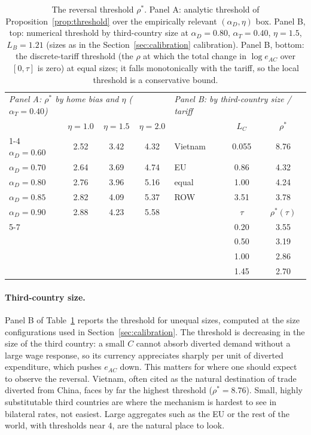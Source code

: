\documentclass[11pt]{article}
\theoremstyle{plain}
\theoremstyle{remark}
\numberwithin{lemma}{section}
\numberwithin{proposition}{section}
\numberwithin{corollary}{section}
\newenvironment{revblock}{\par\begingroup\color{RevBlue}}{\endgroup\par}
\begin{document}
\begin{revblock}
\begin{table}[htbp]
\centering
\begin{tabular}{lccc@{\hspace{1.2cm}}lcc}
\hline\hline
\multicolumn{4}{l}{\textit{Panel A: $\rho^*$ by home bias and $\eta$ ($\alpha_T = 0.40$)}} & \multicolumn{3}{l}{\textit{Panel B: by third-country size / tariff}} \\[2pt]
 & $\eta = 1.0$ & $\eta = 1.5$ & $\eta = 2.0$ & & $L_C$ & $\rho^*$ \\
\cline{1-4}\cline{5-7}
$\alpha_D = 0.60$ & 2.52 & 3.42 & 4.32 & Vietnam & 0.055 & 8.76 \\
$\alpha_D = 0.70$ & 2.64 & 3.69 & 4.74 & EU & 0.86 & 4.32 \\
$\alpha_D = 0.80$ & 2.76 & 3.96 & 5.16 & equal & 1.00 & 4.24 \\
$\alpha_D = 0.85$ & 2.82 & 4.09 & 5.37 & ROW & 3.51 & 3.78 \\
$\alpha_D = 0.90$ & 2.88 & 4.23 & 5.58 & & $\tau$ & $\rho^*(\tau)$ \\
\cline{5-7}
 & & & & & 0.20 & 3.55 \\
 & & & & & 0.50 & 3.19 \\
 & & & & & 1.00 & 2.86 \\
 & & & & & 1.45 & 2.70 \\
\hline\hline
\end{tabular}
\caption{The reversal threshold $\rho^*$. Panel A: analytic threshold of Proposition~\ref{prop:threshold} over the empirically relevant $(\alpha_D, \eta)$ box. Panel B, top: numerical threshold by third-country size at $\alpha_D = 0.80$, $\alpha_T = 0.40$, $\eta = 1.5$, $L_B = 1.21$ (sizes as in the Section~\ref{sec:calibration} calibration). Panel B, bottom: the discrete-tariff threshold (the $\rho$ at which the total change in $\log e_{AC}$ over $[0, \tau]$ is zero) at equal sizes; it falls monotonically with the tariff, so the local threshold is a conservative bound.}
\label{tab:rhostar_grid}
\end{table}

\paragraph{Third-country size.} Panel B of Table~\ref{tab:rhostar_grid} reports the threshold for unequal sizes, computed at the size configurations used in Section~\ref{sec:calibration}. The threshold is decreasing in the size of the third country: a small $C$ cannot absorb diverted demand without a large wage response, so its currency appreciates sharply per unit of diverted expenditure, which pushes $e_{AC}$ down. This matters for where one should expect to observe the reversal. Vietnam, often cited as the natural destination of trade diverted from China, faces by far the highest threshold ($\rho^* = 8.76$). Small, highly substitutable third countries are where the mechanism is hardest to see in bilateral rates, not easiest. Large aggregates such as the EU or the rest of the world, with thresholds near $4$, are the natural place to look.


\end{revblock}
\end{document}
